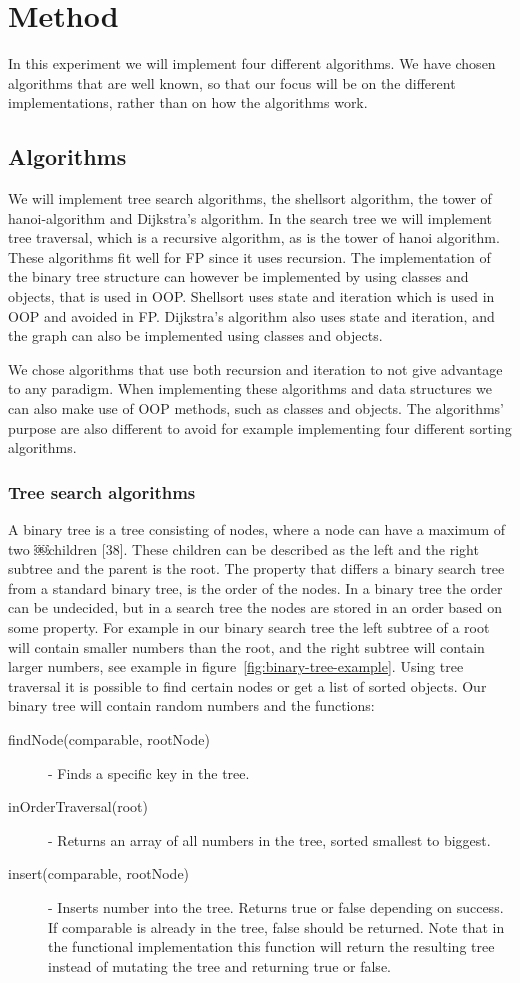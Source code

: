 \documentclass {article}
\begin{document}
\section{Method}
In this experiment we will implement four different algorithms. We have chosen algorithms that are well known, so that our focus will be on the different implementations, rather than on how the algorithms work. 
\subsection{Algorithms}
We will implement tree search algorithms, the shellsort algorithm, the tower of hanoi-algorithm and Dijkstra's algorithm. In the search tree we will implement tree traversal, which is a recursive algorithm, as is the tower of hanoi algorithm. These algorithms fit well for FP since it uses recursion. The implementation of the binary tree structure can however be implemented by using classes and objects, that is used in OOP. Shellsort uses state and iteration which is used in OOP and avoided in FP. Dijkstra's algorithm also uses state and iteration, and the graph can also be implemented using classes and objects.

We chose algorithms that use both recursion and iteration to not give advantage to any paradigm. When implementing these algorithms and data structures we can also make use of OOP methods, such as classes and objects. The algorithms' purpose are also different to avoid for example implementing four different sorting algorithms. 
\subsubsection{Tree search algorithms}
A binary tree is a tree consisting of nodes, where a node can have a maximum of two ￼children [38]. These children can be described as the left and the right subtree and the parent is the root. The property that differs a binary search tree from a standard binary tree, is the order of the nodes. In a binary tree the order can be undecided, but in a search tree the nodes are stored in an order based on some property. For example in our binary search tree the left subtree of a root will contain smaller numbers than the root, and the right subtree will contain larger numbers, see example in figure~\ref{fig:binary-tree-example}. Using tree traversal it is possible to find certain nodes or get a list of sorted objects. Our binary tree will contain random numbers and the functions:
\begin{description}
\item [findNode(comparable, rootNode)] - Finds a specific key in the tree.
\item [inOrderTraversal(root)] - Returns an array of all numbers in the tree, sorted smallest to biggest.
\item [insert(comparable, rootNode)] - Inserts number into the tree. Returns true or false depending on success. If comparable is already in the tree, false should be returned. Note that in the functional implementation this function will return the resulting tree instead of mutating the tree and returning true or false.
\end{description}
\end{document}
